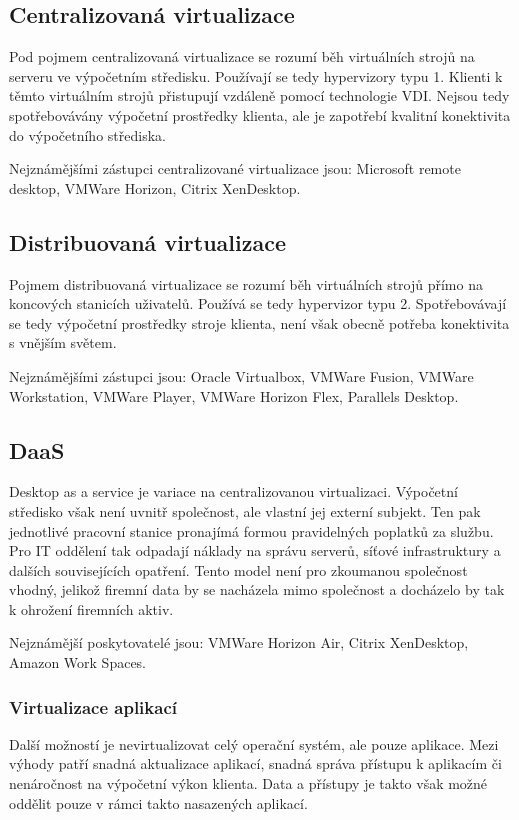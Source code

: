  \subsection{Centralizovaná virtualizace}
 Pod pojmem centralizovaná virtualizace se rozumí běh virtuálních strojů na serveru ve výpočetním středisku. Používají se tedy hypervizory typu 1. Klienti k těmto virtuálním strojů přistupují vzdáleně pomocí technologie VDI. Nejsou tedy spotřebovávány výpočetní prostředky klienta, ale je zapotřebí kvalitní konektivita do výpočetního střediska.
 
 Nejznámějšími zástupci centralizované virtualizace jsou: Microsoft remote desktop, VMWare Horizon, Citrix XenDesktop.
 
 \subsection{Distribuovaná virtualizace}
 Pojmem distribuovaná virtualizace se rozumí běh virtuálních strojů přímo na koncových stanicích uživatelů.  Používá se tedy hypervizor typu 2. Spotřebovávají se tedy výpočetní prostředky stroje klienta, není však obecně potřeba konektivita s vnějším světem.
 
 Nejznámějšími zástupci jsou: Oracle Virtualbox, VMWare Fusion, VMWare Workstation, VMWare Player, VMWare Horizon Flex, Parallels Desktop.
 
 
 \subsection{DaaS}
 Desktop as a service je variace na centralizovanou virtualizaci. Výpočetní středisko však není uvnitř společnost, ale vlastní jej externí subjekt. Ten pak jednotlivé pracovní stanice pronajímá formou pravidelných poplatků za službu. Pro IT oddělení tak odpadají náklady na správu serverů, síťové infrastruktury a dalších souvisejících opatření. Tento model není pro zkoumanou společnost vhodný, jelikož firemní data by se nacházela mimo společnost a docházelo by tak k ohrožení firemních aktiv.
 
 Nejznámější poskytovatelé jsou: VMWare Horizon Air, Citrix XenDesktop, Amazon Work Spaces.
 
  \subsubsection{Virtualizace aplikací}
 Další možností je nevirtualizovat celý operační systém, ale pouze aplikace. Mezi výhody patří snadná aktualizace aplikací, snadná správa přístupu k aplikacím či nenáročnost na výpočetní výkon klienta. Data a přístupy je takto však možné oddělit pouze v rámci takto nasazených aplikací.
 
